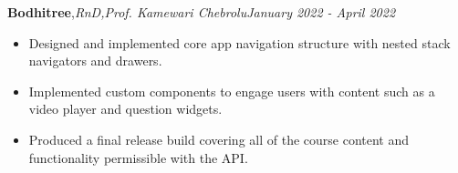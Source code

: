 \textbf{Bodhitree}\sep{\it RnD\sep Prof. Kamewari Chebrolu}\hfill{\sl \small January 2022 - April 2022}\\
\vspace{-5pt}
\begin{itemize}[itemsep = -1.7 mm, leftmargin=*]
\item Designed and implemented core app navigation structure with nested stack navigators and drawers.
\item Implemented custom components to engage users with content such as a video player and question widgets.
\item Produced a final release build covering all of the course content and functionality permissible with the API.
\end{itemize}
